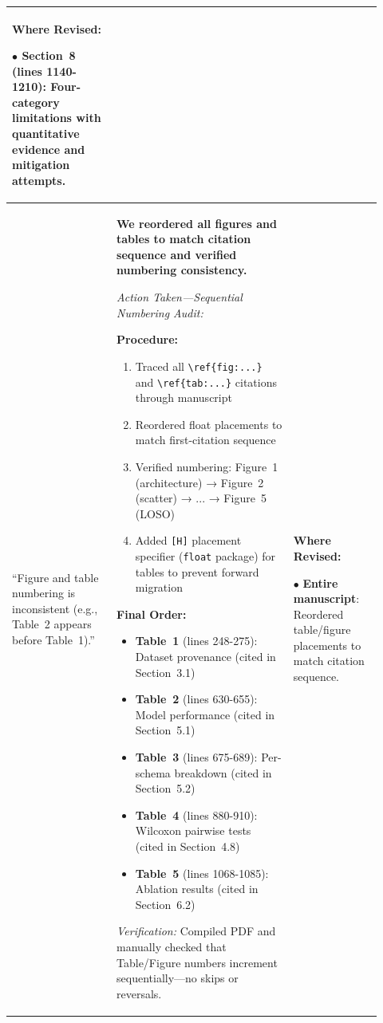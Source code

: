 \documentclass[11pt,a4paper]{article}
\begin{document}
\begin{longtable}{>{\raggedright\arraybackslash}p{0.26\linewidth}|>{\raggedright\arraybackslash}p{0.44\linewidth}|>{\raggedright\arraybackslash}p{0.22\linewidth}}
\textbf{Where Revised:}

$\bullet$ \textbf{Section~8} (lines 1140-1210): Four-category limitations with quantitative evidence and mitigation attempts. \\

\midrule

``Figure and table numbering is inconsistent (e.g., Table~2 appears before Table~1).'' &

\textbf{We reordered all figures and tables to match citation sequence and verified numbering consistency.}

\textit{Action Taken---Sequential Numbering Audit:}

\textbf{Procedure:}
\begin{enumerate}
    \item Traced all \texttt{\textbackslash ref\{fig:...\}} and \texttt{\textbackslash ref\{tab:...\}} citations through manuscript
    \item Reordered float placements to match first-citation sequence
    \item Verified numbering: Figure~1 (architecture) → Figure~2 (scatter) → ... → Figure~5 (LOSO)
    \item Added \texttt{[H]} placement specifier (\texttt{float} package) for tables to prevent forward migration
\end{enumerate}

\textbf{Final Order:}
\begin{itemize}
    \item \textbf{Table~1} (lines 248-275): Dataset provenance (cited in Section~3.1)
    \item \textbf{Table~2} (lines 630-655): Model performance (cited in Section~5.1)
    \item \textbf{Table~3} (lines 675-689): Per-schema breakdown (cited in Section~5.2)
    \item \textbf{Table~4} (lines 880-910): Wilcoxon pairwise tests (cited in Section~4.8)
    \item \textbf{Table~5} (lines 1068-1085): Ablation results (cited in Section~6.2)
\end{itemize}

\textit{Verification:} Compiled PDF and manually checked that Table/Figure numbers increment sequentially---no skips or reversals. &

\textbf{Where Revised:}

$\bullet$ \textbf{Entire manuscript}: Reordered table/figure placements to match citation sequence.


\end{longtable}
\end{document}
